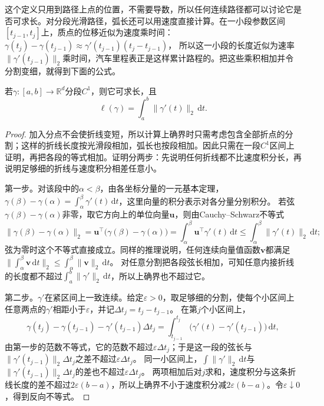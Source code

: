 这个定义只用到路径上点的位置，不需要导数，所以任何连续路径都可以讨论它是否可求长。对分段光滑路径，弧长还可以用速度直接计算。在一小段参数区间$[t_{j-1},t_j]$上，质点的位移近似为速度乘时间：
$\gamma(t_j)-\gamma(t_{j-1})\approx\gamma'(t_{j-1})(t_j-t_{j-1})$，
所以这一小段的长度近似为速率$\lVert\gamma'(t_{j-1})\rVert_2$乘时间，汽车里程表正是这样累计路程的。把这些乘积相加并令分割变细，就得到下面的公式。
\begin{theorem}[分段光滑路径的弧长]
若$\gamma:[a,b]\to\mathbb R^d$分段$C^1$，则它可求长，且
\[
 \ell(\gamma)=\int_a^b\lVert\gamma'(t)\rVert_2\,\mathrm dt.
\]
\end{theorem}
\begin{proof}
加入分点不会使折线变短，所以计算上确界时只需考虑包含全部折点的分割；这样的折线长度按光滑段相加，弧长也按段相加。因此只需在一段$C^1$区间上证明，再把各段的等式相加。证明分两步：先说明任何折线都不比速度积分长，再说明足够细的折线与速度积分相差任意小。

第一步。对该段中的$\alpha<\beta$，由各坐标分量的一元基本定理，
$\gamma(\beta)-\gamma(\alpha)=\int_\alpha^\beta\gamma'(t)\,\mathrm dt$，这里向量的积分表示对各分量分别积分。
若弦$\gamma(\beta)-\gamma(\alpha)$非零，取它方向上的单位向量$\bm u$，则由Cauchy--Schwarz不等式
\[
 \lVert\gamma(\beta)-\gamma(\alpha)\rVert_2
 =\bm u^\top\bigl(\gamma(\beta)-\gamma(\alpha)\bigr)
 =\int_\alpha^\beta\bm u^\top\gamma'(t)\,\mathrm dt
 \leq\int_\alpha^\beta\lVert\gamma'(t)\rVert_2\,\mathrm dt;
\]
弦为零时这个不等式直接成立。同样的推理说明，任何连续向量值函数$\bm v$都满足$\lVert\int_\alpha^\beta\bm v\,\mathrm dt\rVert_2\leq\int_\alpha^\beta\lVert\bm v\rVert_2\,\mathrm dt$。
对任意分割把各段弦长相加，可知任意内接折线的长度都不超过$\int_a^b\lVert\gamma'\rVert_2\,\mathrm dt$，所以上确界也不超过它。

第二步。$\gamma'$在紧区间上一致连续。给定$\varepsilon>0$，取足够细的分割，使每个小区间上任意两点的$\gamma'$相距小于$\varepsilon$，并记$\Delta t_j=t_j-t_{j-1}$。
在第$j$个小区间上，
\[
 \gamma(t_j)-\gamma(t_{j-1})-\gamma'(t_{j-1})\Delta t_j
 =\int_{t_{j-1}}^{t_j}\bigl(\gamma'(t)-\gamma'(t_{j-1})\bigr)\,\mathrm dt,
\]
由第一步的范数不等式，它的范数不超过$\varepsilon\Delta t_j$；于是这一段的弦长与$\lVert\gamma'(t_{j-1})\rVert_2\Delta t_j$之差不超过$\varepsilon\Delta t_j$。
同一小区间上，$\int\lVert\gamma'\rVert_2\,\mathrm dt$与$\lVert\gamma'(t_{j-1})\rVert_2\Delta t_j$的差也不超过$\varepsilon\Delta t_j$。
两项相加后对$j$求和，速度积分与这条折线长度的差不超过$2\varepsilon(b-a)$，所以上确界不小于速度积分减$2\varepsilon(b-a)$。令$\varepsilon\downarrow0$，得到反向不等式。
\end{proof}

